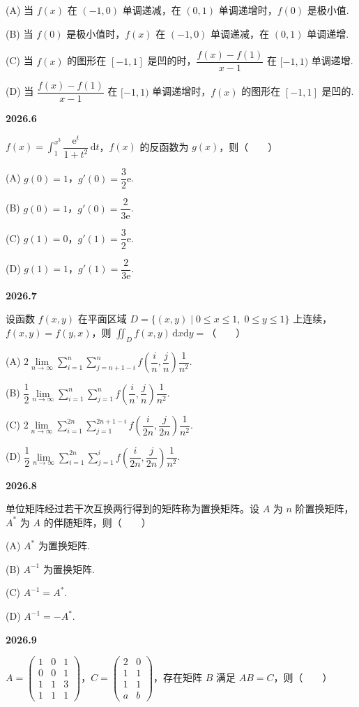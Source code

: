 \documentclass[UTF8,12pt,fontset=windows]{ctexart}
\begin{document}
(A) 当 $f(x)$ 在 $(-1,0)$ 单调递减，在 $(0,1)$ 单调递增时，$f(0)$ 是极小值.

(B) 当 $f(0)$ 是极小值时，$f(x)$ 在 $(-1,0)$ 单调递减，在 $(0,1)$ 单调递增.

(C) 当 $f(x)$ 的图形在 $[-1,1]$ 是凹的时，$\dfrac{f(x)-f(1)}{x-1}$ 在 $[-1,1)$ 单调递增.

(D) 当 $\dfrac{f(x)-f(1)}{x-1}$ 在 $[-1,1)$ 单调递增时，$f(x)$ 的图形在 $[-1,1]$ 是凹的.

\vfill
\newpage
{\large\bfseries 2026.6}

$f(x)=\displaystyle\int_1^{x^3}\dfrac{\mathrm{e}^t}{1+t^2}\,\mathrm{d}t$，$f(x)$ 的反函数为 $g(x)$，则（　　）

(A) $g(0)=1$，$g'(0)=\dfrac32\mathrm{e}$.

(B) $g(0)=1$，$g'(0)=\dfrac{2}{3\mathrm{e}}$.

(C) $g(1)=0$，$g'(1)=\dfrac32\mathrm{e}$.

(D) $g(1)=1$，$g'(1)=\dfrac{2}{3\mathrm{e}}$.

\vfill
\newpage
{\large\bfseries 2026.7}

设函数 $f(x,y)$ 在平面区域 $D=\{(x,y)\mid 0\leqslant x\leqslant1,\;0\leqslant y\leqslant1\}$ 上连续，$f(x,y)=f(y,x)$，则 $\displaystyle\iint_D f(x,y)\,\mathrm{d}x\mathrm{d}y=$（　　）

(A) $2\lim\limits_{n\to\infty}\sum_{i=1}^{n}\sum_{j=n+1-i}^{n}f\left(\dfrac{i}{n},\dfrac{j}{n}\right)\dfrac{1}{n^2}$.

(B) $\dfrac12\lim\limits_{n\to\infty}\sum_{i=1}^{n}\sum_{j=1}^{n}f\left(\dfrac{i}{n},\dfrac{j}{n}\right)\dfrac{1}{n^2}$.

(C) $2\lim\limits_{n\to\infty}\sum_{i=1}^{2n}\sum_{j=1}^{2n+1-i}f\left(\dfrac{i}{2n},\dfrac{j}{2n}\right)\dfrac{1}{n^2}$.

(D) $\dfrac12\lim\limits_{n\to\infty}\sum_{i=1}^{2n}\sum_{j=1}^{i}f\left(\dfrac{i}{2n},\dfrac{j}{2n}\right)\dfrac{1}{n^2}$.

\vfill
\newpage
{\large\bfseries 2026.8}

单位矩阵经过若干次互换两行得到的矩阵称为置换矩阵。设 $A$ 为 $n$ 阶置换矩阵，$A^*$ 为 $A$ 的伴随矩阵，则（　　）

(A) $A^*$ 为置换矩阵.

(B) $A^{-1}$ 为置换矩阵.

(C) $A^{-1}=A^*$.

(D) $A^{-1}=-A^*$.

\vfill
\newpage
{\large\bfseries 2026.9}

$A=\begin{pmatrix}1&0&1\\0&0&1\\1&1&3\\1&1&1\end{pmatrix}$，$C=\begin{pmatrix}2&0\\1&1\\1&1\\a&b\end{pmatrix}$，存在矩阵 $B$ 满足 $AB=C$，则（　　）
\end{document}
